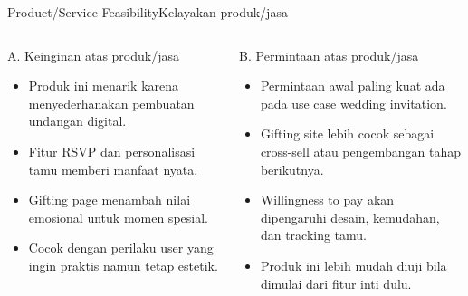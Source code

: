 \documentclass[aspectratio=169,11pt]{beamer}
\begin{document}
\begin{frame}{Product/Service Feasibility}{Kelayakan produk/jasa}
\begin{columns}[T,totalwidth=\textwidth]
\begin{block}{A. Keinginan atas produk/jasa}
\begin{itemize}
  \item Produk ini menarik karena menyederhanakan pembuatan undangan digital.
  \item Fitur RSVP dan personalisasi tamu memberi manfaat nyata.
  \item Gifting page menambah nilai emosional untuk momen spesial.
  \item Cocok dengan perilaku user yang ingin praktis namun tetap estetik.
\end{itemize}
\end{block}

\begin{block}{B. Permintaan atas produk/jasa}
\begin{itemize}
  \item Permintaan awal paling kuat ada pada use case wedding invitation.
  \item Gifting site lebih cocok sebagai cross-sell atau pengembangan tahap berikutnya.
  \item Willingness to pay akan dipengaruhi desain, kemudahan, dan tracking tamu.
  \item Produk ini lebih mudah diuji bila dimulai dari fitur inti dulu.
\end{itemize}
\end{block}
\end{columns}
\end{frame}
\end{document}

